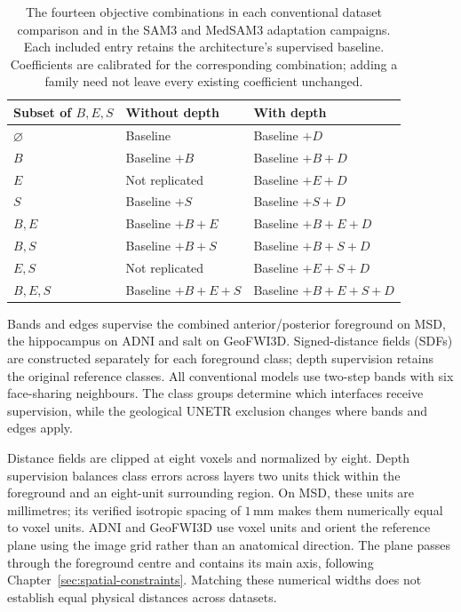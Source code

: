 \begin{table}[htbp]
\centering
\small
{}
\renewcommand{\arraystretch}{1.2}
\begin{tabular}{@{}P{4.6cm}P{4.6cm}P{4.6cm}@{}}
\hline
Subset of $B,E,S$ & Without depth & With depth \\
\hline
$\varnothing$ & Baseline & Baseline $+D$ \\
$B$ & Baseline $+B$ & Baseline $+B+D$ \\
$E$ & Not replicated & Baseline $+E+D$ \\
$S$ & Baseline $+S$ & Baseline $+S+D$ \\
$B,E$ & Baseline $+B+E$ & Baseline $+B+E+D$ \\
$B,S$ & Baseline $+B+S$ & Baseline $+B+S+D$ \\
$E,S$ & Not replicated & Baseline $+E+S+D$ \\
$B,E,S$ & Baseline $+B+E+S$ & Baseline $+B+E+S+D$ \\
\hline
\end{tabular}
\caption{The fourteen objective combinations in each conventional dataset
comparison and in the SAM3 and MedSAM3 adaptation campaigns.
Each included entry retains the architecture's supervised
baseline. Coefficients are calibrated for the corresponding combination;
adding a family need not leave every existing coefficient unchanged.}
\label{tab:constraint-combinations}
\end{table}

Bands and edges supervise the combined anterior/posterior foreground
on MSD, the hippocampus on ADNI and salt on GeoFWI3D. Signed-distance
fields (SDFs) are constructed separately for each foreground class;
depth supervision retains the original reference classes. All
conventional models use two-step bands with six face-sharing neighbours.
The class groups determine which interfaces receive supervision, while
the geological UNETR exclusion changes where bands and edges apply.

Distance fields are clipped at eight voxels and normalized by eight.
Depth supervision balances class errors across layers two units thick
within the foreground and an eight-unit surrounding region. On MSD,
these units are millimetres; its verified isotropic spacing of
$1\,\mathrm{mm}$ makes them numerically equal to voxel units. ADNI and
GeoFWI3D use voxel units and orient the reference plane using the
image grid rather than an anatomical direction. The plane passes
through the foreground centre and contains its main axis, following
Chapter~\ref{sec:spatial-constraints}. Matching these numerical widths
does not establish equal physical distances across datasets.

